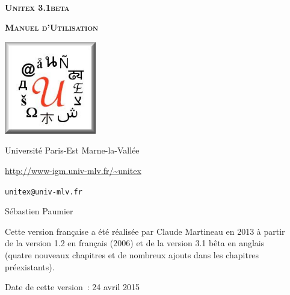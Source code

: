 
\begin{titlepage}
\begin{center}

~

\vspace{3cm}
\Huge
\textsc{\textbf{Unitex 3.1beta}}

\vspace{1cm}

\huge
\textsc{\textbf{Manuel d'Utilisation}}

\vspace{2cm}

  \begin{center}
    \includegraphics[width=4cm]{resources/img/logo-Unitex.png}
  \end{center}
\normalsize

\vspace{2cm}

\LARGE

Université Paris-Est Marne-la-Vallée
\bigskip
\normalsize

\url{http://www-igm.univ-mlv.fr/~unitex}

\verb$unitex@univ-mlv.fr$

\vspace{1cm}

Sébastien Paumier
\bigskip

Cette version française a été réalisée par Claude Martineau en 2013 à partir\\
de la version 1.2 en français (2006) et de la version 3.1 bêta en anglais \\
(quatre nouveaux chapitres et de nombreux ajouts dans les chapitres préexistants).
\bigskip

Date de cette version~: 24 avril 2015

\end{center}

\end{titlepage}
